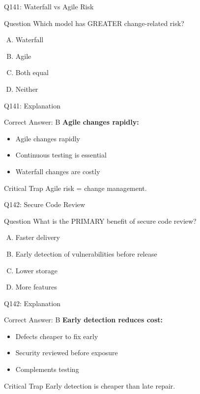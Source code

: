 \documentclass{beamer}
\begin{document}
	\begin{frame}{Q141: Waterfall vs Agile Risk}
		\begin{block}{Question}
			Which model has GREATER change-related risk?
		\end{block}
		\begin{enumerate}[(A)]
			\item Waterfall
			\item Agile
			\item Both equal
			\item Neither
		\end{enumerate}
	\end{frame}
	
	\begin{frame}{Q141: Explanation}
		\begin{block}{Correct Answer: B}
			\textbf{Agile changes rapidly:}
			\begin{itemize}
				\item Agile changes rapidly
				\item Continuous testing is essential
				\item Waterfall changes are costly
			\end{itemize}
		\end{block}
		\begin{alertblock}{Critical Trap}
			Agile risk = change management.
		\end{alertblock}
	\end{frame}
	
	\begin{frame}{Q142: Secure Code Review}
		\begin{block}{Question}
			What is the PRIMARY benefit of secure code review?
		\end{block}
		\begin{enumerate}[(A)]
			\item Faster delivery
			\item Early detection of vulnerabilities before release
			\item Lower storage
			\item More features
		\end{enumerate}
	\end{frame}
	
	\begin{frame}{Q142: Explanation}
		\begin{block}{Correct Answer: B}
			\textbf{Early detection reduces cost:}
			\begin{itemize}
				\item Defects cheaper to fix early
				\item Security reviewed before exposure
				\item Complements testing
			\end{itemize}
		\end{block}
		\begin{alertblock}{Critical Trap}
			Early detection is cheaper than late repair.
		\end{alertblock}
	\end{frame}
	
\end{document}
